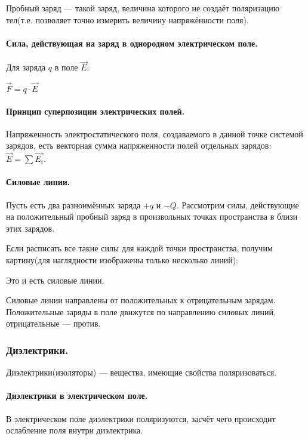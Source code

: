 \documentclass{article}
\begin{document}
                Пробный заряд --- такой заряд, величина которого не создаёт поляризацию тел(т.е. позволяет точно измерить величину напряжённости поля).
            \paragraph{Сила, действующая на заряд в однородном электрическом поле.}
                Для заряда \(q\) в поле \(\vec E\):

                \(\vec F = q \cdot \vec E\)
            \paragraph{Принцип суперпозиции электрических полей.}
                Напряженность электростатического поля, создаваемого в данной точке системой зарядов, есть векторная сумма напряженности полей отдельных зарядов: \(\vec E = \sum{\vec{E_i}}\).
            \paragraph{Силовые линии.}
                Пусть есть два разноимённых заряда \(+q\) и \(-Q\). Рассмотрим силы, действующие на положительный пробный заряд в произвольных точках пространства в близи этих зарядов.
                

                Если расписать все такие силы для каждой точки пространства, получим картину(для наглядности изображены только несколько линий):
                

                Это и есть силовые линии.

                Силовые линии направлены от положительных к отрицательным зарядам. Положительные заряды в поле движутся по направлению силовых линий, отрицательные --- против.
        \subsubsection{Диэлектрики.}
                Диэлектрики(изоляторы) --- вещества, имеющие свойства поляризоваться.
            \paragraph{Диэлектрики в электрическом поле.}
                В электрическом поле диэлектрики поляризуются, засчёт чего происходит ослабление поля внутри диэлектрика.
\end{document}
